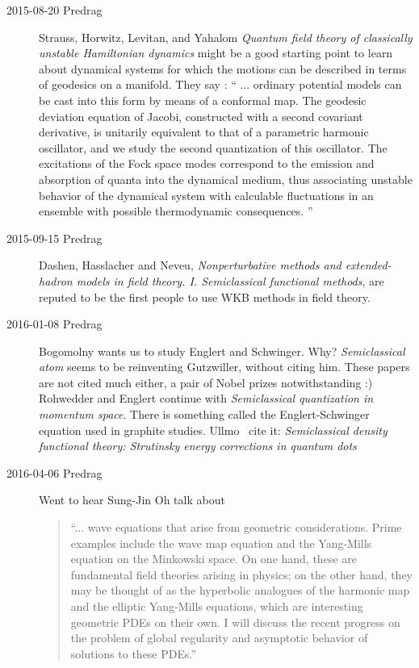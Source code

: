 \begin{description}
\item[2015-08-20 Predrag]
Strauss, Horwitz, Levitan, and Yahalom
{\em Quantum field theory of classically unstable {Hamiltonian} dynamics}
might be a good starting point to learn about dynamical systems for which
the motions can be described in terms of geodesics on a manifold. They
say : ``
... ordinary potential models can be cast into this form by means of a
conformal map. The geodesic deviation equation of Jacobi, constructed
with a second covariant derivative, is unitarily equivalent to that of a
parametric harmonic oscillator, and we study the second quantization of
this oscillator. The excitations of the Fock space modes correspond to
the emission and absorption of quanta into the dynamical medium, thus
associating unstable behavior of the dynamical system with calculable
fluctuations in an ensemble with possible thermodynamic consequences.
''

\item[2015-09-15 Predrag]
Dashen, Hasslacher and Neveu,
\emph{Nonperturbative methods and extended-hadron models in field theory.
{I}. {Semiclassical} functional methods},
are reputed to be the first people to use WKB methods in field theory.


\item[2016-01-08 Predrag]
Bogomolny wants us to study Englert and
Schwinger. Why?
 {\em Semiclassical atom} seems to be reinventing
Gutzwiller, without citing him. These papers are not cited much either, a
pair of Nobel prizes notwithstanding :) Rohwedder and
Englert continue with {\em Semiclassical quantization in
momentum space}. There is something called the Englert-Schwinger equation
used in graphite studies. Ullmo~\etal{} cite it:
{\em Semiclassical density functional theory: {Strutinsky} energy
corrections in quantum dots}

\item[2016-04-06 Predrag]
Went to hear
{Sung-Jin Oh} talk about

\begin{quote}
``... wave equations that arise from geometric
considerations. Prime examples include the wave map equation and
the Yang-Mills equation on the Minkowski space. On one hand, these
are fundamental field theories arising in physics; on the other hand,
they may be thought of as the hyperbolic analogues of the harmonic map
and the elliptic Yang-Mills equations, which are interesting geometric
PDEs on their own. I will discuss the recent progress on the problem of
global regularity and asymptotic behavior of solutions to these PDEs.''
\end{quote}


\end{description}
